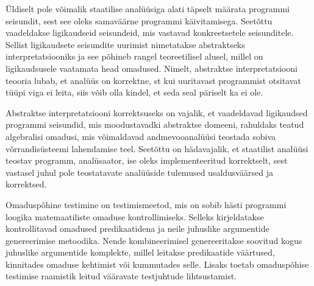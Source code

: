 \documentclass[../thesis.tex]{subfiles}
\begin{document}
Üldiselt pole võimalik staatilise analüüsiga alati täpselt määrata programmi seisundit, sest see oleks samaväärne programmi käivitamisega. Seetõttu vaadeldakse ligikaudseid seisundeid, mis vastavad konkreetsetele seisunditele. Sellist ligikaudsete seisundite uurimist nimetatakse abstraktseks interpretatsiooniks ja see põhineb rangel teoreetilisel alusel, millel on ligikaudsusele vaatamata head omadused. Nimelt, abstraktse interpretatsiooni teooria lubab, et analüüs on korrektne, st kui uuritavast programmist otsitavat tüüpi viga ei leita, siis võib olla kindel, et seda seal päriselt ka ei ole.

Abstraktse interpretatsiooni korrektsuseks on vajalik, et vaadeldavad ligikaudsed programmi seisundid, mis moodustavadki abstraktse domeeni, rahuldaks teatud algebralisi omadusi, mis võimaldavad andmevooanalüüsi teostada sobiva võrrandisüsteemi lahendamise teel. Seetõttu on hädavajalik, et staatilist analüüsi teostav programm, analüsaator, ise oleks implementeeritud korrektselt, sest vastasel juhul pole teostatavate analüüside tulemused usaldusväärsed ja korrektsed.

Omaduspõhine testimine on testimismeetod, mis on sobib hästi programmi loogika matemaatiliste omaduse kontrollimiseks. Selleks kirjeldatakse kontrollitavad omadused predikaatidena ja neile juhuslike argumentide genereerimise metoodika. Nende kombineerimisel genereeritakse soovitud kogus juhuslike argumentide komplekte, millel leitakse predikaatide väärtused, kinnitades omaduse kehtimist või kummutades selle. Lisaks toetab omaduspõhise testimise raamistik leitud vääravate testjuhtude lihtsustamist.

\end{document}
